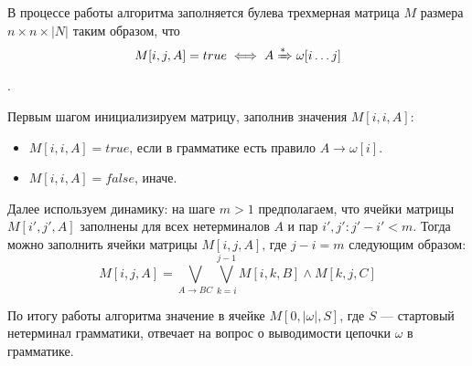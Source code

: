 В процессе работы алгоритма заполняется булева трехмерная матрица $M$ размера $n \times n \times  |N|$ таким образом, что
\[M[i, j, A] = true \iff A \xRightarrow[]{*} \omega[i \dots j]\].

Первым шагом инициализируем матрицу, заполнив значения $M[i, i, A]$:

\begin{itemize}
  \item $M[i, i, A] = true \text{, если в грамматике есть правило } A \to \omega[i]$.
  \item $M[i, i, A] = false$, иначе.
\end{itemize}

Далее используем динамику: на шаге $m > 1$ предполагаем, что ячейки матрицы $M[i', j', A]$ заполнены для всех нетерминалов $A$ и пар $i', j': j' - i' < m$.
Тогда можно заполнить ячейки матрицы $M[i, j, A] \text{, где } j - i = m$ следующим образом:
\[ M[i, j, A] = \bigvee_{A \to B C}^{}{\bigvee_{k=i}^{j-1}{M[i, k, B] \wedge M[k, j, C]}} \]

По итогу работы алгоритма значение в ячейке $M[0, |\omega|, S]$, где $S$ --- стартовый нетерминал грамматики, отвечает на вопрос о выводимости цепочки $\omega$ в грамматике.

